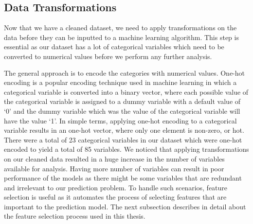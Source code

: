 \documentclass[11pt,openright]{report}
\begin{document}
\subsection {Data Transformations}
Now that we have a cleaned dataset, we need to apply transformations on the data before they can be inputted to a machine learning algorithm. This step is essential as our dataset has a lot of categorical variables which need to be converted to numerical values before we perform any further analysis. 

The general approach is to encode the categories with numerical values. One-hot encoding is a popular encoding technique used in machine learning in which a categorical variable is converted into a binary vector, where each possible value of the categorical variable is assigned to a dummy variable with a default value of `0' and the dummy variable which was the value of the categorical variable will have the value `1'. In simple terms, applying one-hot encoding to a categorical variable results in an one-hot vector, where only one element is non-zero, or hot. There were a total of 23 categorical variables in our dataset which were one-hot encoded to yield a total of 85 variables. We noticed that applying transformations on our cleaned data resulted in a huge increase in the number of variables available for analysis. Having more number of variables can result in poor performance of the models as there might be some variables that are redundant and irrelevant to our prediction problem. To handle such scenarios, feature selection is useful as it automates the process of selecting features that are important to the prediction model. The next subsection describes in detail about the feature selection process used in this thesis.
\end{document}
